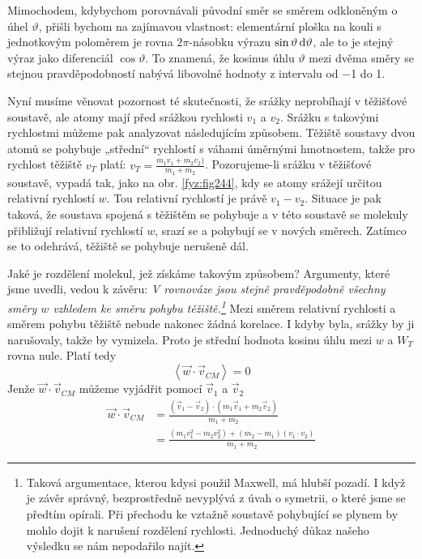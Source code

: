     Mimochodem, kdybychom porovnávali původní směr se směrem odkloněným o úhel \(\vartheta\), přišli
    bychom na zajímavou vlastnost: elementární ploška na kouli s jednotkovým poloměrem je rovna
    \(2\pi\)-násobku výrazu \(\sin\vartheta\dif\vartheta\), ale to je stejný výraz jako diferenciál
    \(\cos\vartheta\). To znamená, že kosinus úhlu \(\vartheta\) mezi dvěma směry se stejnou
    pravděpodobností nabývá libovolné hodnoty z intervalu od \num{-1} do \num{+1}.

    Nyní musíme věnovat pozornost té skutečnosti, že srážky neprobíhají v těžišťové soustavě, ale
    atomy mají před srážkou rychlosti \(v_1\) a \(v_2\). Srážku s takovými rychlostmi můžeme pak
    analyzovat následujícím způsobem. Těžiště soustavy dvou atomů se pohybuje „střední“ rychlostí s
    váhami úměrnými hmotnostem, takže pro rychlost těžiště \(v_T\) platí: \(v_T = \frac{m_1v_1 +
    m_2v_2)}{m_1 + m_2}\). Pozorujeme-li srážku v těžišťové soustavě, vypadá tak, jako na obr.
    \ref{fyz:fig244}, kdy se atomy srážejí určitou relativní rychlostí \(w\). Tou relativní
    rychlostí je právě \(v_1-v_2\). Situace je pak taková, že soustava spojená s těžištěm se
    pohybuje a v této soustavě se molekuly přibližují relativní rychlostí \(w\), srazí se a pohybují
    se v nových směrech. Zatímco se to odehrává, těžiště se pohybuje nerušeně dál.

    Jaké je rozdělení molekul, jež získáme takovým způsobem? Argumenty, které jsme uvedli, vedou k
    závěru: \emph{V rovnováze jsou stejně pravděpodobně všechny směry \(w\) vzhledem ke směru pohybu
    těžiště.\footnote{Taková argumentace, kterou kdysi použil Maxwell, má hlubší pozadí. I když je
    závěr správný, bezprostředně nevyplývá z úvah o symetrii, o které jsme se předtím opírali. Při
    přechodu ke vztažně soustavě pohybující se plynem by mohlo dojit k narušení rozdělení rychlosti.
    Jednoduchý důkaz našeho výsledku se nám nepodařilo najít.}} Mezi směrem relativní rychlosti a
    směrem pohybu těžiště nebude nakonec žádná korelace. I kdyby byla, srážky by ji narušovaly,
    takže by vymizela. Proto je střední hodnota kosinu úhlu mezi \(w\) a \(W_T\) rovna nule. Platí
    tedy
    \begin{equation}\label{fyz:eq629}
      \left\langle\vec{w}\cdot\vec{v}_{CM}\right\rangle = 0
    \end{equation}
    Jenže \(\vec{w}\cdot\vec{v}_{CM}\) můžeme vyjádřit pomocí \(\vec{v}_1\) a \(\vec{v}_2\)
    \begin{align}
      \vec{w}\cdot\vec{v}_{CM} 
        &= \frac{(\vec{v}_1−\vec{v}_2)\cdot(m_1\vec{v}_1+m_2\vec{v}_2)}{m_1+m_2} \nonumber \\
        &= \frac{(m_1v^2_1−m_2v^2_2)+(m_2−m_1)(v_1\cdot v_2)}{m_1+m_2} \label{fyz:eq630}
    \end{align}


